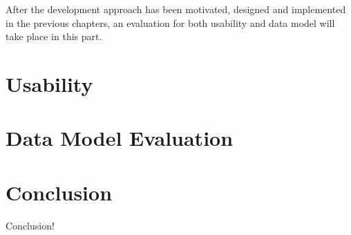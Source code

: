 After the development approach has been motivated, designed and implemented in the previous chapters, an evaluation for both usability and data model  will take place in this part.


\section{Usability}


\section{Data Model Evaluation}


% 




\section{Conclusion}
Conclusion!
